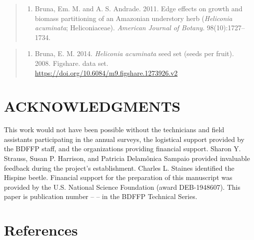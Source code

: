 \documentclass[
  12pt,
  man, donotrepeattitle,floatsintext]{apa6}
\providecommand{\tightlist}{%
  \setlength{\itemsep}{0pt}\setlength{\parskip}{0pt}}
\begin{document}
\begin{quote}
\begin{enumerate}
\def\labelenumi{\arabic{enumi}.}
\setcounter{enumi}{6}
\tightlist
\item
  Bruna, Em. M. and A. S. Andrade. 2011. Edge effects on growth and biomass partitioning of an Amazonian understory herb (\emph{Heliconia acuminata}; Heliconiaceae). \emph{American Journal of Botany}. 98(10):1727--1734.
\end{enumerate}
\end{quote}

\begin{quote}
\begin{enumerate}
\def\labelenumi{\arabic{enumi}.}
\setcounter{enumi}{7}
\tightlist
\item
  Bruna, E. M. 2014. \emph{Heliconia acuminata} seed set (seeds per fruit). 2008. Figshare. data set. \url{https://doi.org/10.6084/m9.figshare.1273926.v2}
\end{enumerate}
\end{quote}

\hypertarget{acknowledgments}{%
\section{ACKNOWLEDGMENTS}\label{acknowledgments}}

\noindent  
This work would not have been possible without the technicians and field assistants participating in the annual surveys, the logistical support provided by the BDFFP staff, and the organizations providing financial support. Sharon Y. Strauss, Susan P. Harrison, and Patricia Delamônica Sampaio provided invaluable feedback during the project's establishment. Charles L. Staines identified the Hispine beetle. Financial support for the preparation of this manuscript was provided by the U.S. National Science Foundation (award DEB-1948607). This paper is publication number -- -- in the BDFFP Technical Series.

\newpage

\hypertarget{references}{%
\section{References}\label{references}}

\begingroup
\setlength{\parindent}{0in}
\setlength{\leftskip}{0in}
\end{document}
